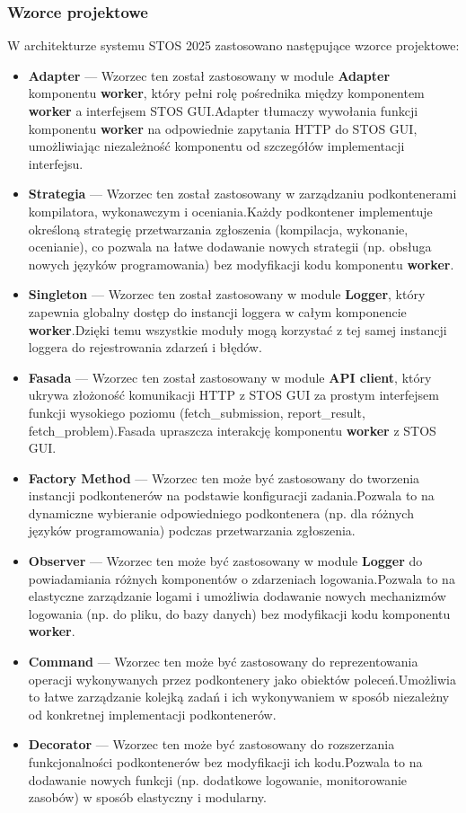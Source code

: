 \documentclass[12pt,a4paper]{article}
\begin{document}
\subsubsection{Wzorce projektowe}
W architekturze systemu STOS 2025 zastosowano następujące wzorce projektowe:
\begin{itemize}
    \item \textbf{Adapter} --- Wzorzec ten został zastosowany w module \textbf{Adapter} komponentu \textbf{worker}, który pełni rolę pośrednika między komponentem \textbf{worker} a interfejsem STOS GUI.\@ Adapter tłumaczy wywołania funkcji komponentu \textbf{worker} na odpowiednie zapytania HTTP do STOS GUI, umożliwiając niezależność komponentu od szczegółów implementacji interfejsu.
    \item \textbf{Strategia} --- Wzorzec ten został zastosowany w zarządzaniu podkontenerami kompilatora, wykonawczym i oceniania.\@ Każdy podkontener implementuje określoną strategię przetwarzania zgłoszenia (kompilacja, wykonanie, ocenianie), co pozwala na łatwe dodawanie nowych strategii (np. obsługa nowych języków programowania) bez modyfikacji kodu komponentu \textbf{worker}.
    \item \textbf{Singleton} --- Wzorzec ten został zastosowany w module \textbf{Logger}, który zapewnia globalny dostęp do instancji loggera w całym komponencie \textbf{worker}.\@ Dzięki temu wszystkie moduły mogą korzystać z tej samej instancji loggera do rejestrowania zdarzeń i błędów.
    \item \textbf{Fasada} --- Wzorzec ten został zastosowany w module \textbf{API client}, który ukrywa złożoność komunikacji HTTP z STOS GUI za prostym interfejsem funkcji wysokiego poziomu (fetch\_submission, report\_result, fetch\_problem).\@ Fasada upraszcza interakcję komponentu \textbf{worker} z STOS GUI.
    \item \textbf{Factory Method} --- Wzorzec ten może być zastosowany do tworzenia instancji podkontenerów na podstawie konfiguracji zadania.\@ Pozwala to na dynamiczne wybieranie odpowiedniego podkontenera (np. dla różnych języków programowania) podczas przetwarzania zgłoszenia.
    \item \textbf{Observer} --- Wzorzec ten może być zastosowany w module \textbf{Logger} do powiadamiania różnych komponentów o zdarzeniach logowania.\@ Pozwala to na elastyczne zarządzanie logami i umożliwia dodawanie nowych mechanizmów logowania (np. do pliku, do bazy danych) bez modyfikacji kodu komponentu \textbf{worker}.
    \item \textbf{Command} --- Wzorzec ten może być zastosowany do reprezentowania operacji wykonywanych przez podkontenery jako obiektów poleceń.\@ Umożliwia to łatwe zarządzanie kolejką zadań i ich wykonywaniem w sposób niezależny od konkretnej implementacji podkontenerów.
    \item \textbf{Decorator} --- Wzorzec ten może być zastosowany do rozszerzania funkcjonalności podkontenerów bez modyfikacji ich kodu.\@ Pozwala to na dodawanie nowych funkcji (np. dodatkowe logowanie, monitorowanie zasobów) w sposób elastyczny i modularny.
\end{itemize}
\end{document}
